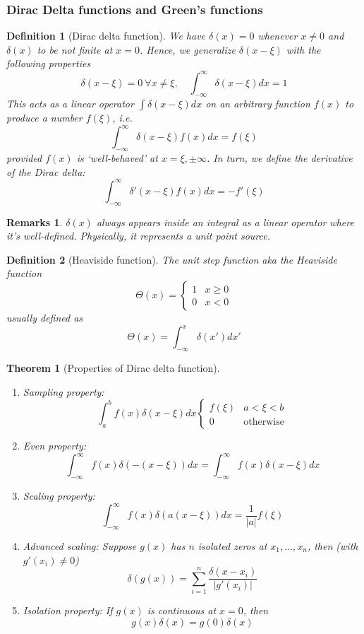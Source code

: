 \documentclass[a4paper]{article}
\newtheorem{remarks}{Remarks}[section]
\theoremstyle{new}
\newtheorem{defi}{Definition}[section]
\newtheorem{thm}{Theorem}[section]
\begin{document}
\subsubsection{Dirac Delta functions and Green's functions}
\begin{defi}[Dirac delta function]
We have $\delta(x)=0$ whenever $x\neq 0$ and $\delta(x)$ to be not finite at $x=0$. Hence, we generalize $\delta(x-\xi)$ with the following properties
$$\delta(x-\xi)=0~\forall x\neq\xi,\quad\int_{-\infty}^\infty\delta(x-\xi)dx=1$$
This acts as a linear operator $\int\delta(x-\xi)dx$ on an arbitrary function $f(x)$ to produce a number $f(\xi)$, i.e.
$$\int_{-\infty}^\infty\delta(x-\xi)f(x)dx=f(\xi)$$
provided $f(x)$ is `well-behaved' at $x=\xi,\pm\infty$. In turn, we define the derivative of the Dirac delta:
$$\int_{-\infty}^\infty\delta'(x-\xi)f(x)dx=-f'(\xi)$$
\end{defi}
\begin{remarks}
$\delta(x)$ always appears inside an integral as a linear operator where it's well-defined. Physically, it represents a unit point source.
\end{remarks}
\begin{defi}[Heaviside function]
The unit step function aka the Heaviside function
$$
   \Theta(x)=
\left\{
        \begin{array}{ll}
      1 & x\geq0\\
      0 & x<0
        \end{array}
    \right.$$
    usually defined as 
$$\Theta(x)=\int_{-\infty}^x\delta(x')dx'$$
\end{defi}
\begin{thm}[Properties of Dirac delta function]\leavevmode
\begin{enumerate}
    \item Sampling property:
$$ \int_a^bf(x)\delta(x-\xi)dx
\left\{
        \begin{array}{ll}
      f(\xi) & a<\xi<b\\
      0 & \text{otherwise}
        \end{array}
    \right.$$
\item Even property: 
$$ \int_{-\infty}^\infty f(x)\delta(-(x-\xi))dx=\int_{-\infty}^\infty f(x)\delta(x-\xi)dx$$
\item Scaling property: 
$$\int_{-\infty}^\infty f(x)\delta(a(x-\xi))dx=\frac{1}{|a|}f(\xi)$$
\item Advanced scaling:
Suppose $g(x)$ has $n$ isolated zeros at $x_1,\dots,x_n$, then (with $g'(x_i)\neq 0$)
$$\delta(g(x))=\sum_{i=1}^n\frac{\delta(x-x_i)}{|g'(x_i)|}$$
\item Isolation property:
If $g(x)$ is continuous at $x=0$, then
$$g(x)\delta(x)=g(0)\delta(x)$$
\end{enumerate}
\end{thm}
\end{document}
